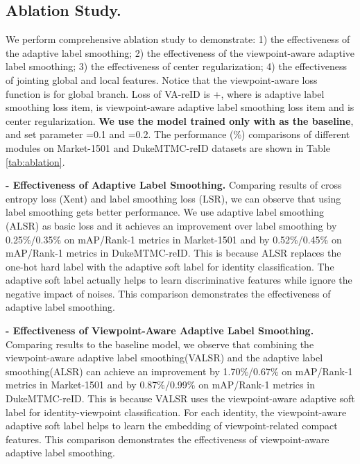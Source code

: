 \documentclass[letterpaper]{article} \usepackage{aaai20}  \usepackage{times}  \usepackage{helvet} \usepackage{courier}  \usepackage[hyphens]{url}  \usepackage{graphicx} \usepackage{array}
\begin{document}
\subsection{Ablation Study.}
We perform comprehensive ablation study to demonstrate: 1) the effectiveness of the adaptive label smoothing; 2) the effectiveness of the viewpoint-aware adaptive label smoothing; 3) the effectiveness of center regularization; 4) the effectiveness of jointing global and local features. Notice that the viewpoint-aware loss function  is for global branch. Loss of VA-reID is +, where  is adaptive label smoothing loss item,  is viewpoint-aware adaptive label smoothing loss item and  is center regularization. \textbf{We use the model trained only with  as the baseline}, and set parameter =0.1 and  =0.2. The performance (\%) comparisons of different modules on Market-1501 and DukeMTMC-reID datasets are shown in Table \ref{tab:ablation}. 


\noindent \textbf{ - Effectiveness of Adaptive Label Smoothing.}
Comparing results of cross entropy loss (Xent) and label smoothing loss (LSR), we can observe that using label smoothing gets better performance. We use adaptive label smoothing (ALSR) as basic loss and it achieves an improvement over label smoothing by 0.25\%/0.35\% on mAP/Rank-1 metrics in Market-1501 and by 0.52\%/0.45\% on mAP/Rank-1 metrics in DukeMTMC-reID. This is because ALSR replaces the one-hot hard label with the adaptive soft label for identity classification. The adaptive soft label actually helps to learn discriminative features while ignore the negative impact of noises. This comparison demonstrates the effectiveness of adaptive label smoothing. 


\noindent \textbf{ - Effectiveness of Viewpoint-Aware Adaptive Label Smoothing.}
Comparing results to the baseline model, we observe that combining the viewpoint-aware adaptive label smoothing(VALSR) and the adaptive label smoothing(ALSR) can achieve an improvement by 1.70\%/0.67\% on mAP/Rank-1 metrics in Market-1501 and by 0.87\%/0.99\% on mAP/Rank-1 metrics in DukeMTMC-reID. This is because VALSR uses the viewpoint-aware adaptive soft label for identity-viewpoint classification. For each identity, the viewpoint-aware adaptive soft label helps to learn the embedding of viewpoint-related compact features. This comparison demonstrates the effectiveness of viewpoint-aware adaptive label smoothing. 
\end{document}
